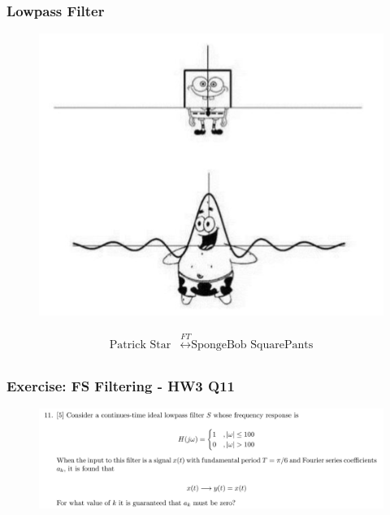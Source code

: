 \documentclass{beamer}
\begin{document}
\begin{frame}[t]
    \frametitle{Lowpass Filter}
    \begin{figure}
        \includegraphics[width=0.4\linewidth]{sponge.PNG}
    \end{figure}
    \begin{center}
        \begin{align*}
            \text{Patrick Star} &\stackrel{FT}{\longleftrightarrow} \text{SpongeBob SquarePants}    \\[1em]          
        \end{align*}
    \end{center} 
\end{frame}



\begin{frame}[t]
    \frametitle{Exercise: FS Filtering - HW3 Q11}
    \begin{figure}
        \includegraphics[width=1\linewidth]{hw3_q11}
    \end{figure}
\end{frame}
\end{document}
